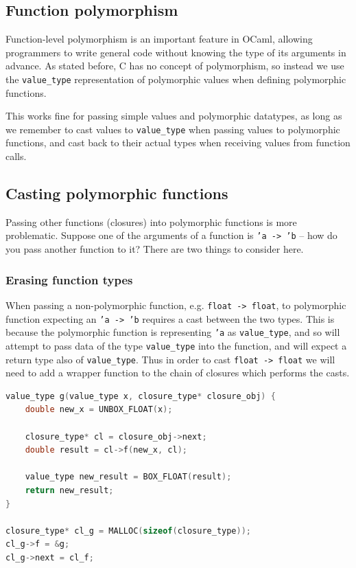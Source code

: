 \documentclass[12pt,a4paper,twoside,openright]{report}
\begin{document}
\subsection{Function polymorphism}

Function-level polymorphism is an important feature in OCaml, allowing 
programmers to write general code without knowing the type of its arguments in 
advance. As stated before, C has no concept of polymorphism, so instead we use 
the \verb|value_type| representation of polymorphic values when defining 
polymorphic functions.

This works fine for passing simple values and polymorphic datatypes, as long as 
we remember to cast values to \verb|value_type| when passing values to 
polymorphic functions, and cast back to their actual types when receiving 
values from function calls.

\subsection{Casting polymorphic functions}

Passing other functions (closures) into polymorphic functions is more 
problematic. Suppose one of the arguments of a function is \texttt{'a -> 'b} -- 
how do you pass another function to it? There are two things to consider here.

\subsubsection{Erasing function types}

When passing a non-polymorphic function, e.g. \texttt{float -> float}, to 
polymorphic function expecting an \texttt{'a -> 'b} requires a cast between the 
two types. This is because the polymorphic function is representing \texttt{'a} 
as \verb|value_type|, and so will attempt to pass data of the type 
\verb|value_type| into the function, and will expect a return type also of 
\verb|value_type|. Thus in order to cast \texttt{float -> float} we will need 
to add a wrapper function to the chain of closures which performs the casts.

\begin{lstlisting}[language=C]
value_type g(value_type x, closure_type* closure_obj) {
    double new_x = UNBOX_FLOAT(x);

    closure_type* cl = closure_obj->next;
    double result = cl->f(new_x, cl);
    
    value_type new_result = BOX_FLOAT(result);
    return new_result;
}

closure_type* cl_g = MALLOC(sizeof(closure_type));
cl_g->f = &g;
cl_g->next = cl_f;
\end{lstlisting}
\end{document}
